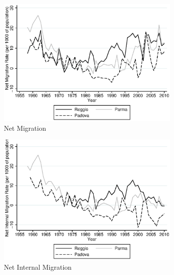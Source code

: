 \begin{figure}[H]
      \centering
        \begin{subfigure}[t]{0.49\textwidth}
          \includegraphics[width=\textwidth]{../../output/image/netmigration.eps}       
\caption{Net Migration}        
        \end{subfigure}
        \begin{subfigure}[t]{0.49\textwidth}
          \includegraphics[width=\textwidth]{../../output/image/netinternalmig.eps}       
 \caption{Net Internal Migration}        
        \end{subfigure}
        \begin{subfigure}[t]{0.49\textwidth}

\end{subfigure}
\end{figure}
